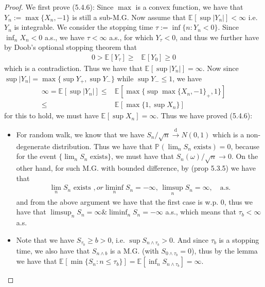 \documentclass[11pt,a4paper]{article}
\numberwithin{equation}{section}%
\begin{document}
\begin{proof}
    We first prove (5.4.6): Since $ \max $ is a convex function, we have that $ Y_n:=\max\{X_n,-1\} $ is still a sub-M.G. Now assume that $ \mathbb{E}_{  }\left[ \sup \left\vert Y_n \right\vert  \right]  <\infty $ i.e. $ Y_n $ is integrable. We consider the stopping time $ \tau:= \inf\{n: Y_n<0\}  $. Since $ \inf_n X_n <0 $ a.s., we have $ \tau <\infty $ a.s., for which $ Y_\tau <0 $, and thus we further have by Doob's optional stopping theorem that
    \begin{align*}
        0>\mathbb{E}_{  }\left[ Y_\tau \right] \geq & \mathbb{E}_{  }\left[ Y_0 \right] \geq 0
    \end{align*}
    which is a contradiction. Thus we have that $ \mathbb{E}_{  }\left[ \sup \left\vert Y_n \right\vert  \right]  =\infty $. Now since $ \sup \left\vert Y_n \right\vert  = \max \{ \sup Y_+, \sup Y_- \} $ while $ \sup Y_- \leq 1 $, we have
    \begin{align*}
        \infty = \mathbb{E}_{  }\left[ \sup\left\vert Y_n \right\vert  \right]  \leq & \mathbb{E}_{  }\left[ \max \{ \sup \max\{X_n,-1\}_+, 1 \}\right] \\
        \leq& \mathbb{E}_{  }\left[ \max\{ 1, \sup{X_n}\} \right] 
    \end{align*}
    for this to hold, we must have $ \mathbb{E}_{  }\left[ \sup X_n \right] =\infty $. Thus we have proved (5.4.6):

    \begin{itemize}[topsep=2pt,itemsep=0pt]
        \item For random walk, we know that we have $ S_n/\sqrt{n}\xrightarrow[]{\mathrm{d}} N(0,1) $ which is a non-degenerate distribution. Thus we have that $ \mathbb{P}_{  }\left( \lim_n S_n \text{ exists} \right)  = 0 $, because for the event $ \{\lim_n S_n \text{ exists}\} $, we must have that $ S_n(\omega )/\sqrt{n}\to 0 $. On the other hand, for such M.G. with bounded difference, by (prop 5.3.5) we have that 
        \begin{align*}
            \lim_n S_n \text{ exists }, or \liminf_n S_n = -\infty,\, \limsup_n S_n = \infty,\quad \text{a.s.}
        \end{align*}
        and from the above argument we have that the first case is w.p. 0, thus we have that $ \limsup_n S_n = \infty \& \liminf_n S_n = -\infty $ a.s., which means that $ \tau_b<\infty $ a.s.
        \item Note that we have $ S_{\tau_b} \geq b >0 $, i.e. $ \sup S_{n\wedge \tau_b} >0 $. And since $ \tau_b $ is a stopping time, we also have that $ S_{n\wedge b} $ is a M.G. (with $ S_{0\wedge \tau_b}=0 $), thus by the lemma we have that $ \mathbb{E}_{  }\left[ \min\{S_n:n\leq \tau_b \}\right] =  \mathbb{E}_{  }\left[ \inf_n S_{n\wedge \tau_b} \right] = \infty  $.
    \end{itemize}
    
        
\end{proof}
\end{document}
